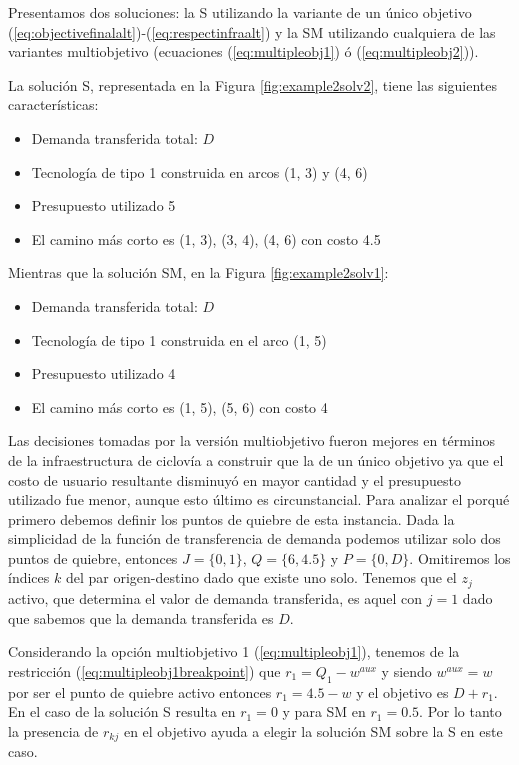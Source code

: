 \documentclass{article}
\begin{document}
  \FloatBarrier

  Presentamos dos soluciones: la S utilizando la variante de un único objetivo (\ref{eq:objectivefinalalt})-(\ref{eq:respectinfraalt}) y la SM utilizando cualquiera de las variantes multiobjetivo (ecuaciones (\ref{eq:multipleobj1}) ó (\ref{eq:multipleobj2})).

  La solución S, representada en la Figura \ref{fig:example2solv2}, tiene las siguientes características:

  \begin{itemize}
    \item{Demanda transferida total: $D$}
    \item{Tecnología de tipo 1 construida en arcos (1, 3) y (4, 6)}
    \item{Presupuesto utilizado 5}
    \item{El camino más corto es (1, 3), (3, 4), (4, 6) con costo 4.5}
  \end{itemize}

  Mientras que la solución SM, en la Figura \ref{fig:example2solv1}:

  \begin{itemize}
    \item{Demanda transferida total: $D$}
    \item{Tecnología de tipo 1 construida en el arco (1, 5)}
    \item{Presupuesto utilizado 4}
    \item{El camino más corto es (1, 5), (5, 6) con costo 4}
  \end{itemize}

  Las decisiones tomadas por la versión multiobjetivo fueron mejores en términos de la infraestructura de ciclovía a construir que la de un único objetivo ya que el costo de usuario resultante disminuyó en mayor cantidad y el presupuesto utilizado fue menor, aunque esto último es circunstancial. Para analizar el porqué primero debemos definir los puntos de quiebre de esta instancia. Dada la simplicidad de la función de transferencia de demanda podemos utilizar solo dos puntos de quiebre, entonces $J = \{0, 1\}$, $Q = \{6, 4.5\}$ y $P = \{0, D\}$. Omitiremos los índices $k$ del par origen-destino dado que existe uno solo. Tenemos que el $z_j$ activo, que determina el valor de demanda transferida, es aquel con $j = 1$ dado que sabemos que la demanda transferida es $D$.

  Considerando la opción multiobjetivo 1 (\ref{eq:multipleobj1}), tenemos de la restricción (\ref{eq:multipleobj1breakpoint}) que $r_1 = Q_1 - w^{aux}$ y siendo $w^{aux} = w$ por ser el punto de quiebre activo entonces $r_1 = 4.5 - w$ y el objetivo es $D + r_1$. En el caso de la solución S resulta en $r_1 = 0$ y para SM en $r_1 = 0.5$. Por lo tanto la presencia de $r_{kj}$ en el objetivo ayuda a elegir la solución SM sobre la S en este caso.
\end{document}
